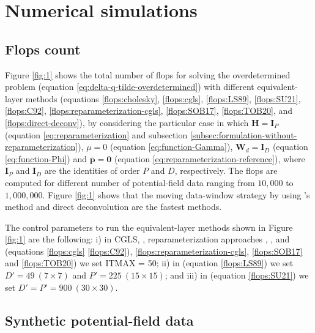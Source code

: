 \section{Numerical simulations}
\label{sec:numerical-simulations}

\subsection{Flops count}
\label{subsec:flops-count}

Figure \ref{fig:1} shows the total number of flops for solving the overdetermined problem
(equation \ref{eq:delta-q-tilde-overdetermined}) with different equivalent-layer methods
(equations \ref{flops:cholesky}, \ref{flops:cgls}, \ref{flops:LS89}, \ref{flops:SU21}, 
\ref{flops:C92}, \ref{flops:reparameterization-cgls}, \ref{flops:SOB17}, \ref{flops:TOB20},
and \ref{flops:direct-deconv}), by considering 
the particular case in which $\mathbf{H} = \mathbf{I}_{P}$ (equation \ref{eq:reparameterization} and 
subsection \ref{subsec:formulation-without-reparameterization}),
$\mu = 0$ (equation \ref{eq:function-Gamma}), 
$\mathbf{W}_{d} = \mathbf{I}_{D}$ (equation \ref{eq:function-Phi}) and
$\bar{\mathbf{p}} = \mathbf{0}$ (equation \ref{eq:reparameterization-reference}), 
where $\mathbf{I}_{P}$ and $\mathbf{I}_{D}$ are the identities of order $P$ and $D$, respectively.
The flops are computed for different number of potential-field data ranging from $10,000$ to $1,000,000$.
Figure \ref{fig:1} shows that the moving data-window strategy by using 
\citeauthor{leao-silva1989}'s \citeyear{leao-silva1989} method and direct deconvolution are the fastest methods.

The control parameters to run the equivalent-layer methods shown in Figure 
 \ref{fig:1}  are the following: 
i) in CGLS, 
\cite{cordell1992}, 
reparameterization approaches \cite[e.g.,][]{oliveirajr-etal2013; mendonca-2020}, 
\cite{siqueira-etal2017}, and 
\cite{takahashi-etal2020}
(equations \ref{flops:cgls} \ref{flops:C92}), 
\ref{flops:reparameterization-cgls},  \ref{flops:SOB17} and \ref{flops:TOB20}) we set ITMAX = 50; 
ii) in \cite{leao-silva1989} (equation \ref{flops:LS89}) we set 
$D'= 49 \: (7 \times 7)$ and $P' = 225 \: (15 \times 15) $; and
iii) in \cite{soler-uieda2021} (equation  \ref{flops:SU21}) we set 
$D'= P' = 900 \: (30 \times 30)$.

\subsection{Synthetic potential-field data}
\label{subsec:synthetic-data}

